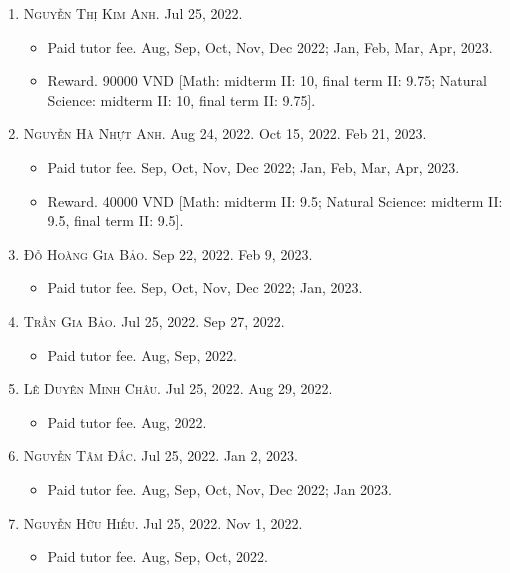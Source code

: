 \documentclass{article}
\begin{document}
\begin{enumerate}
	\item \textsc{Nguyễn Thị Kim Anh.} {\sf[In]} Jul 25, 2022.
	\begin{itemize}
		\item {\sf Paid tutor fee.} Aug, Sep, Oct, Nov, Dec 2022; Jan, Feb, Mar, Apr, 2023.
		\item {\sf Reward.} 90000 VND [Math: midterm II: 10, final term II: 9.75; Natural Science: midterm II: 10, final term II: 9.75].
	\end{itemize}
	\item \textsc{Nguyễn Hà Nhựt Anh.} {\sf[In]} Aug 24, 2022. {\sf[Re-In]} Oct 15, 2022. Feb 21, 2023.
	\begin{itemize}
		\item {\sf Paid tutor fee.} Sep, Oct, Nov, Dec 2022; Jan, Feb, Mar, Apr, 2023.
		\item {\sf Reward.} 40000 VND [Math: midterm II: 9.5; Natural Science: midterm II: 9.5, final term II: 9.5].
	\end{itemize}
	\item \textsc{Đỗ Hoàng Gia Bảo.} {\sf[In]} Sep 22, 2022. {\sf[Out]} Feb 9, 2023.
	\begin{itemize}
		\item {\sf Paid tutor fee.} Sep, Oct, Nov, Dec 2022; Jan, 2023.
	\end{itemize}
	\item \textsc{Trần Gia Bảo.} {\sf[In]} Jul 25, 2022. {\sf[Out]} Sep 27, 2022.
	\begin{itemize}
		\item {\sf Paid tutor fee.} Aug, Sep, 2022.
	\end{itemize}
	\item \textsc{Lê Duyên Minh Châu.} {\sf[In]} Jul 25, 2022. {\sf[Out]} Aug 29, 2022.
	\begin{itemize}
		\item {\sf Paid tutor fee.} Aug, 2022.
	\end{itemize}
	\item \textsc{Nguyễn Tâm Đắc.} {\sf[In]} Jul 25, 2022. {\sf[Out]} Jan 2, 2023.
	\begin{itemize}
		\item {\sf Paid tutor fee.} Aug, Sep, Oct, Nov, Dec 2022; Jan 2023.
	\end{itemize}
	\item \textsc{Nguyễn Hữu Hiếu.} {\sf[In]} Jul 25, 2022. {\sf[Out]} Nov 1, 2022.
	\begin{itemize}
		\item {\sf Paid tutor fee.} Aug, Sep, Oct, 2022.

\end{itemize}
\end{enumerate}
\end{document}
